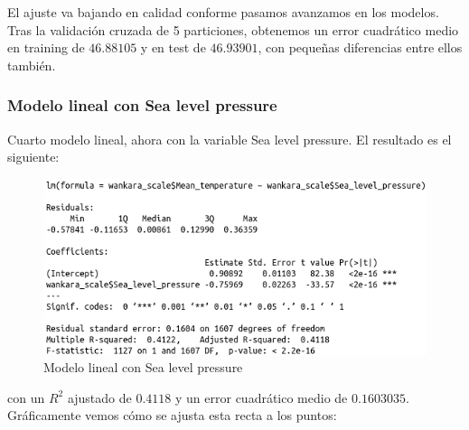 El ajuste va bajando en calidad conforme pasamos avanzamos en los modelos. Tras la validación cruzada de 5 particiones, obtenemos un error cuadrático medio en training de $46.88105$ y en test de $46.93901$, con pequeñas diferencias entre ellos también.

\subsubsection{Modelo lineal con Sea level pressure}

Cuarto modelo lineal, ahora con la variable Sea level pressure. El resultado es el siguiente:

\begin{figure}[H] %
	\centering
	\includegraphics[scale=0.55]{lm4.png}  %
	\caption{Modelo lineal con Sea level pressure} 
	\label{fig:lm4}
\end{figure}

con un $R^2$ ajustado de $0.4118$  y un error cuadrático medio de $0.1603035$. Gráficamente vemos cómo se ajusta esta recta a los puntos:

